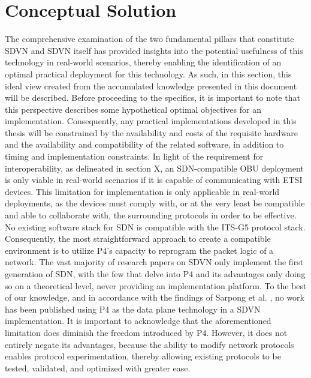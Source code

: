 \chapter{Conceptual Solution}
\label{cha:conceptual_solution}

    The comprehensive examination of the two fundamental pillars that constitute SDVN and SDVN itself has provided insights into the potential usefulness of this technology in real-world scenarios, thereby enabling the identification of an optimal practical deployment for this technology. As such, in this section, this ideal view created from the accumulated knowledge presented in this document will be described.
    Before proceeding to the specifics, it is important to note that this perspective describes some hypothetical optimal objectives for an implementation. Consequently, any practical implementations developed in this thesis will be constrained by the availability and costs of the requisite hardware and the availability and compatibility of the related software, in addition to timing and implementation constraints.
    In light of the requirement for interoperability, as delineated in section X, an SDN-compatible OBU deployment is only viable in real-world scenarios if it is capable of communicating with ETSI devices. This limitation for implementation is only applicable in real-world deployments, as the devices must comply with, or at the very least be compatible and able to collaborate with, the surrounding protocols in order to be effective. No existing software stack for SDN is compatible with the ITS-G5 protocol stack. Consequently, the most straightforward approach to create a compatible environment is to utilize P4’s capacity to reprogram the packet logic of a network. 
    The vast majority of research papers on SDVN only implement the first generation of SDN, with the few that delve into P4 and its advantages only doing so on a theoretical level, never providing an implementation platform. To the best of our knowledge, and in accordance with the findings of Sarpong et al. \cite{Sarpong et al., 2023}, no work has been published using P4 as the data plane technology in a SDVN implementation. 
    It is important to acknowledge that the aforementioned limitation does diminish the freedom introduced by P4. However, it does not entirely negate its advantages, because the ability to modify network protocols enables protocol experimentation, thereby allowing existing protocols to be tested, validated, and optimized with greater ease.
